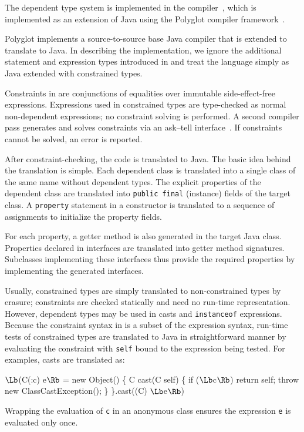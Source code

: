 %

The dependent type system is implemented in the \Xten{}
compiler~\cite{X10}, which is implemented as an extension of
Java using the Polyglot compiler framework~\cite{ncm03}.

Polyglot implements a source-to-source base Java compiler 
that is extended to translate \Xten{} to Java.  In describing the
implementation, we ignore the additional statement and expression types
introduced in \Xten{} and treat the language simply as Java
extended with constrained types.

Constraints in \Xten{} are conjunctions of equalities over immutable
side-effect-free expressions.  Expressions used in constrained
types are type-checked as normal non-dependent \Xten{} expressions;
no constraint solving is performed.
A second compiler pass generates and solves constraints via an
ask--tell interface~\cite{my-thesis-book}.
If constraints cannot be solved, an error is reported.

After constraint-checking, the \Xten{} code is translated to Java.
The basic idea behind the translation is simple. Each dependent class
is translated into a single class of the same name without dependent
types. The explicit properties of the dependent class are translated
into {\tt public final} (instance) fields of the target class.
A {\tt property} statement in a constructor is translated to a
sequence of assignments to initialize the property fields.

For each property, a getter method is also generated in the
target Java class.
Properties declared in interfaces are translated into getter
method signatures.  Subclasses implementing these interfaces
thus provide the required properties by implementing the
generated interfaces.

Usually, constrained types are simply translated to
non-constrained types by erasure; constraints are checked
statically and need no run-time representation.
However, dependent types may be used in casts
and {\tt instanceof} expressions.  Because the constraint syntax
in \Xten{} is a subset of the \Xten{} expression syntax, run-time tests
of constrained types are translated to Java
in straightforward manner by evaluating the constraint with
{\tt self} bound to the expression being tested.
For examples, casts are translated as:
\begin{code}
  $\Lb$(C(:c) e$\Rb$ = 
    new Object() \{
      C cast(C self) \{
        if ($\Lb$c$\Rb$) return self;
        throw new ClassCastException(); \}
    \}.cast((C) $\Lb$e$\Rb$)
\end{code}
\noindent Wrapping the evaluation of {\tt c} in an anonymous class
ensures the expression {\tt e} is evaluated only once.

